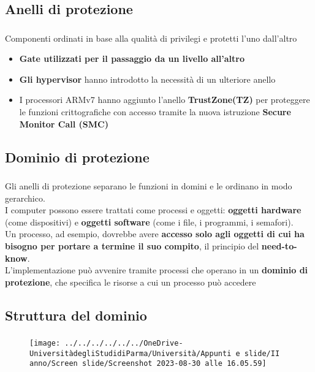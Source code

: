 \documentclass{beamer}
\newenvironment{mainframe}{
	\begin{frame}
		\frametitle{\insertsubsection}
		\framesubtitle{\insertsection}
	}{
	\end{frame}
}
\begin{document}
\subsection{Anelli di protezione}
\begin{mainframe}
	Componenti ordinati in base alla qualità di privilegi e protetti l'uno dall'altro
	\begin{itemize}
		\item \textbf{Gate utilizzati per il passaggio da un livello all'altro}
		\item \textbf{Gli hypervisor} hanno introdotto la necessità di un ulteriore anello
		\item I processori ARMv7 hanno aggiunto l'anello \textbf{TrustZone(TZ)} per proteggere le funzioni crittografiche con accesso tramite la nuova istruzione \textbf{Secure Monitor Call (SMC)}
	\end{itemize}
\end{mainframe}
\subsection{Dominio di protezione}
\begin{mainframe}
	Gli anelli di protezione separano le funzioni in domini e le ordinano in modo gerarchico.\\
	I computer possono essere trattati come processi e oggetti: \textbf{oggetti hardware} (come dispositivi) e \textbf{oggetti software} (come i file, i programmi, i semafori).\\
	Un processo, ad esempio, dovrebbe avere \textbf{accesso solo agli oggetti di cui ha bisogno per portare a termine il suo compito}, il principio del \textbf{need-to-know}.\\
	L'implementazione può avvenire tramite processi che operano in un \textbf{dominio di protezione}, che specifica le risorse a cui un processo può accedere
\end{mainframe}
\subsection{Struttura del dominio}
\begin{mainframe}
	\begin{figure}
		\centering
		\texttt{[image: ../../../../../../OneDrive-UniversitàdegliStudidiParma/Università/Appunti e slide/II anno/Screen slide/Screenshot 2023-08-30 alle 16.05.59]}
	\end{figure}
\end{mainframe}
\end{document}
